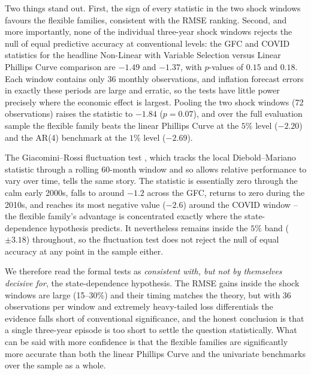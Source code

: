 \documentclass[12pt,a4paper]{article}
\begin{document}
Two things stand out. First, the sign of every statistic in the two shock windows favours the flexible families, consistent with the RMSE ranking. Second, and more importantly, none of the individual three-year shock windows rejects the null of equal predictive accuracy at conventional levels: the GFC and COVID statistics for the headline Non-Linear with Variable Selection versus Linear Phillips Curve comparison are $-1.49$ and $-1.37$, with $p$-values of $0.15$ and $0.18$. Each window contains only 36 monthly observations, and inflation forecast errors in exactly these periods are large and erratic, so the tests have little power precisely where the economic effect is largest. Pooling the two shock windows (72 observations) raises the statistic to $-1.84$ ($p = 0.07$), and over the full evaluation sample the flexible family beats the linear Phillips Curve at the $5\%$ level ($-2.20$) and the AR(4) benchmark at the $1\%$ level ($-2.69$).

\begin{table}[H]
  \centering
  \caption{Diebold--Mariano tests with the Harvey--Leybourne--Newbold correction, $h=3$, absolute-error loss. A negative statistic favours the first model. $^{*}$, $^{**}$, $^{***}$ denote significance at the $10\%$, $5\%$ and $1\%$ level.}
  \label{tab:dm}
  \fontsize{9}{11}\selectfont
  
\end{table}

The Giacomini--Rossi fluctuation test \citep{giacominirossi2010}, which tracks the local Diebold--Mariano statistic through a rolling 60-month window and so allows relative performance to vary over time, tells the same story. The statistic is essentially zero through the calm early 2000s, falls to around $-1.2$ across the GFC, returns to zero during the 2010s, and reaches its most negative value ($-2.6$) around the COVID window -- the flexible family's advantage is concentrated exactly where the state-dependence hypothesis predicts. It nevertheless remains inside the $5\%$ band ($\pm 3.18$) throughout, so the fluctuation test does not reject the null of equal accuracy at any point in the sample either.

We therefore read the formal tests as \emph{consistent with, but not by themselves decisive for}, the state-dependence hypothesis. The RMSE gains inside the shock windows are large (15--30\%) and their timing matches the theory, but with 36 observations per window and extremely heavy-tailed loss differentials the evidence falls short of conventional significance, and the honest conclusion is that a single three-year episode is too short to settle the question statistically. What can be said with more confidence is that the flexible families are significantly more accurate than both the linear Phillips Curve and the univariate benchmarks over the sample as a whole.
\end{document}
